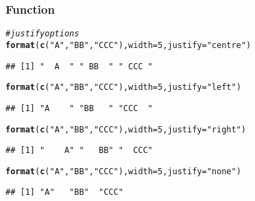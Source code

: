 \documentclass[12pt]{beamer}\usepackage[]{graphicx}\usepackage[]{color}
\makeatletter
\newcommand{\hlnum}[1]{\textcolor[rgb]{0.686,0.059,0.569}{#1}}%
\newcommand{\hlstr}[1]{\textcolor[rgb]{0.192,0.494,0.8}{#1}}%
\newcommand{\hlcom}[1]{\textcolor[rgb]{0.678,0.584,0.686}{\textit{#1}}}%
\newcommand{\hlstd}[1]{\textcolor[rgb]{0.345,0.345,0.345}{#1}}%
\newcommand{\hlkwc}[1]{\textcolor[rgb]{0.333,0.667,0.333}{#1}}%
\newcommand{\hlkwd}[1]{\textcolor[rgb]{0.737,0.353,0.396}{\textbf{#1}}}%
\newenvironment{kframe}{%
 \def\at@end@of@kframe{}%
 \ifinner\ifhmode%
  \def\at@end@of@kframe{\end{minipage}}%
  \begin{minipage}{\columnwidth}%
 \fi\fi%
 \def\FrameCommand##1{\hskip\@totalleftmargin \hskip-\fboxsep
 \colorbox{shadecolor}{##1}\hskip-\fboxsep
     \hskip-\linewidth \hskip-\@totalleftmargin \hskip\columnwidth}%
 \MakeFramed {\advance\hsize-\width
   \@totalleftmargin\z@ \linewidth\hsize
   \@setminipage}}%
 {\par\unskip\endMakeFramed%
 \at@end@of@kframe}
\newenvironment{knitrout}{}{} %
\makeatother
\begin{document}
\begin{frame}[fragile]
\frametitle{Function }

\begin{knitrout}\footnotesize
{}\color{fgcolor}\begin{kframe}
\begin{alltt}
\hlcom{# justify options}
\hlkwd{format}\hlstd{(}\hlkwd{c}\hlstd{(}\hlstr{"A"}\hlstd{,} \hlstr{"BB"}\hlstd{,} \hlstr{"CCC"}\hlstd{),} \hlkwc{width} \hlstd{=} \hlnum{5}\hlstd{,} \hlkwc{justify} \hlstd{=} \hlstr{"centre"}\hlstd{)}
\end{alltt}
\begin{verbatim}
## [1] "  A  " " BB  " " CCC "
\end{verbatim}
\begin{alltt}
\hlkwd{format}\hlstd{(}\hlkwd{c}\hlstd{(}\hlstr{"A"}\hlstd{,} \hlstr{"BB"}\hlstd{,} \hlstr{"CCC"}\hlstd{),} \hlkwc{width} \hlstd{=} \hlnum{5}\hlstd{,} \hlkwc{justify} \hlstd{=} \hlstr{"left"}\hlstd{)}
\end{alltt}
\begin{verbatim}
## [1] "A    " "BB   " "CCC  "
\end{verbatim}
\begin{alltt}
\hlkwd{format}\hlstd{(}\hlkwd{c}\hlstd{(}\hlstr{"A"}\hlstd{,} \hlstr{"BB"}\hlstd{,} \hlstr{"CCC"}\hlstd{),} \hlkwc{width} \hlstd{=} \hlnum{5}\hlstd{,} \hlkwc{justify} \hlstd{=} \hlstr{"right"}\hlstd{)}
\end{alltt}
\begin{verbatim}
## [1] "    A" "   BB" "  CCC"
\end{verbatim}
\begin{alltt}
\hlkwd{format}\hlstd{(}\hlkwd{c}\hlstd{(}\hlstr{"A"}\hlstd{,} \hlstr{"BB"}\hlstd{,} \hlstr{"CCC"}\hlstd{),} \hlkwc{width} \hlstd{=} \hlnum{5}\hlstd{,} \hlkwc{justify} \hlstd{=} \hlstr{"none"}\hlstd{)}
\end{alltt}
\begin{verbatim}
## [1] "A"   "BB"  "CCC"
\end{verbatim}
\end{kframe}
\end{knitrout}

\end{frame}

\end{document}

